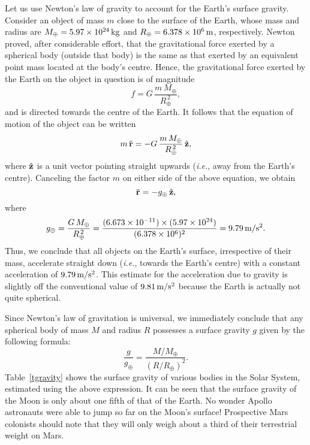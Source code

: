 Let us use Newton's law of gravity to account for the Earth's surface gravity. 
Consider an object of mass $m$ close to the surface of the Earth, whose mass
and radius are $M_\oplus =5.97\times 10^{24}\,{\rm kg}$ and $R_\oplus = 6.378\times 10^6\,{\rm m}$, 
respectively. Newton proved, after considerable effort, that the gravitational force 
exerted by a spherical body (outside that body) is the same as that exerted by an
equivalent  point mass located at the body's centre. Hence, the gravitational
force exerted by the Earth on the object in question is of magnitude
\begin{equation}
f = G\, \frac{m\,M_\oplus}{R_\oplus^{\,2}},
\end{equation}
and is directed towards the centre of the Earth. It follows that the equation of
motion of the object can be written
\begin{equation}
m\,\ddot{\bf r} = - G\, \frac{m\,M_\oplus}{R_\oplus^{\,2}}\,\hat{\bf z},
\end{equation}
where $\hat{\bf z}$ is a unit vector pointing straight upwards ({\em i.e.}, away
from the Earth's centre). Canceling the factor $m$ on either side of the above
equation, we obtain
\begin{equation}
\ddot{\bf r} = - g_\oplus\,\hat{\bf z},
\end{equation}
where
\begin{equation}
g_\oplus = \frac{G\, M_\oplus}{R_\oplus^{\,2}} =  \frac{ (6.673\times 10^{-11})\times
(5.97\times 10^{24})}{(6.378\times 10^6)^2} = 9.79\,{\rm m/s^2}.\label{sgrav}
\end{equation}
Thus, we conclude that all objects on the Earth's surface, irrespective of
their mass,  accelerate straight down ({\em i.e.}, towards the Earth's centre)
with a constant acceleration of $9.79\,{\rm m/s^2}$. This estimate for the
acceleration due to gravity is slightly off the conventional value of $9.81\,{\rm m/s^2}$
because the Earth is actually not quite spherical.

Since Newton's law of gravitation is universal, we immediately conclude that  any
spherical body of mass $M$ and radius $R$ possesses a surface gravity $g$ given
by the following formula:
\begin{equation}
\frac{g}{g_\oplus} = \frac{M/M_\oplus}{(R/R_\oplus)^2}.
\end{equation}
Table~\ref{tgravity} shows the surface gravity of various bodies in the Solar System,
estimated using the above expression. It can be seen that the surface gravity of the
Moon is only about one fifth of that of the Earth. No wonder Apollo astronauts were able
to jump so far on the Moon's surface! Prospective Mars colonists should note that they
will only weigh about a third of their terrestrial weight on Mars. 

